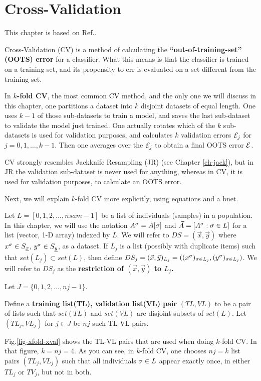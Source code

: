 \chapter{Cross-Validation}
\label{ch-cross-val}

This chapter is based on Ref.\cite{wiki-xval}.

Cross-Validation (CV)
is a method 
of calculating the 
{\bf \enquote{out-of-training-set} (OOTS) error}
for a classifier.
What this means is that the classifier 
is trained on a training set,
and its propensity to err is evaluated
on a set different from the training set.

In {\bf $k$-fold CV}, the most common CV method, 
and the only one we will discuss in this chapter,
one
partitions a  
dataset into $k$ disjoint datasets
of equal length.
One uses $k-1$ of those
sub-datasets to train a model,
and saves the last sub-dataset to
validate the model just trained.
One actually rotates which of 
the $k$ sub-datasets is used 
for validation purposes,
and calculates $k$ validation 
errors ${\cal E}_j$ for $j=0, 1, \ldots, k-1$.
Then one averages over the ${\cal E}_j$
to obtain a final OOTS error ${\cal E}$. 

CV strongly resembles
Jackknife
Resampling (JR) 
(see Chapter \ref{ch-jack}),
but in JR 
the validation sub-dataset is
never used for anything,
whereas in CV,
it is used for validation
purposes, to calculate
an OOTS error.

Next, we will
explain $k$-fold CV more explicitly,
using 
equations and a bnet.


Let $L=[0,1,2, \ldots, nsam-1]$ be a list of
individuals (samples) in a population.
In this chapter, we will use the notation 
$A^\sigma=A[\sigma]$ 
and $\vec{A}=[A^\sigma:\sigma\in L]$
for a  list (vector, 1-D  array) indexed by $L$.
We will refer to $DS=(\vec{x}, \vec{y})$ 
where $x^\sigma\in S_{\underline{x}}$, $y^\sigma\in S_{\underline{y}}$,
as a dataset.
If
$L_j$ is a list (possibly with 
duplicate items)
such that $set(L_j)\subset set(L)$, then
define
$DS_j=(\vec{x}, \vec{y})_{L_j}=
((x^\sigma)_{\sigma\in L_j}, 
(y^\sigma)_{\sigma\in L_j})$.
We will
refer to $DS_j$
as the {\bf restriction of 
$(\vec{x}, \vec{y})$ to $L_j$.}

Let
$J=\{0,1, 2, \ldots, nj-1\}$.

Define a {\bf training list(TL),
validation list(VL) pair} $(TL,VL)$
to be a pair of lists
such that 
$set(TL)$ and $set(VL)$
are disjoint subsets
of $set(L)$.
Let $(TL_j, VL_j)$ for $j\in J$
be $nj$ such TL-VL pairs.


Fig.\ref{fig-xfold-xval} 
shows
the TL-VL pairs 
that are used
when doing $k$-fold 
CV.
In that figure, $k=nj=4$.
As you can see,
in $k$-fold CV, one chooses 
$nj=k$ list pairs $(TL_j, VL_j)$
such that all individuals $\sigma\in L$
appear exactly once, in either
$TL_j$ or $TV_j$, but not in both.

